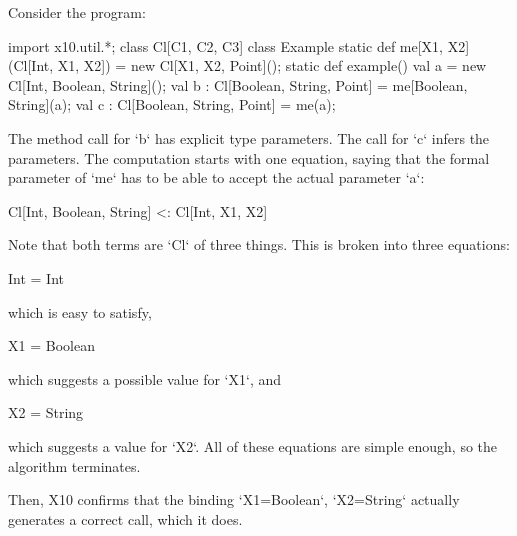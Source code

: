 \begin{ex}
Consider the program: 
\begin{xten}
import x10.util.*;
class Cl[C1, C2, C3]{}
class Example {
  static def me[X1, X2](Cl[Int, X1, X2]) = 
     new Cl[X1, X2, Point]();
  static def example() {
    val a = new Cl[Int, Boolean, String]();
    val b : Cl[Boolean, String, Point] 
          = me[Boolean, String](a);
    val c : Cl[Boolean, String, Point] 
          = me(a);
  }
}
\end{xten}
%
The method call for \xcd`b` has explicit type parameters.  
The call for \xcd`c` infers the parameters.  The computation 
starts with one equation, saying that the formal parameter of 
\xcd`me` has to be able to accept the actual parameter \xcd`a`:
\begin{xtenmath}
 Cl[Int, Boolean, String] <: Cl[Int, X1, X2] 
\end{xtenmath}
Note that both terms are \xcd`Cl` of three things. 
This is broken into three equations: 
\begin{xtenmath}
Int = Int
\end{xtenmath}
which is easy to satisfy,
\begin{xtenmath}
X1 = Boolean
\end{xtenmath}
which suggests a possible value for \xcd`X1`,  and 
\begin{xtenmath}
X2 = String
\end{xtenmath}
which suggests a value for \xcd`X2`.  
All of these equations are simple enough, so the algorithm terminates. 

Then, X10 confirms that the binding \xcd`X1=Boolean`, \xcd`X2=String`
actually generates a correct call, which it does.  
\end{ex}



